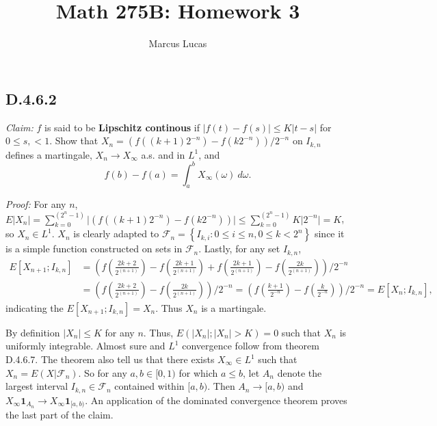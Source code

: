 \documentclass[10pt]{article}
\title{Math 275B: Homework 3}
\author{Marcus Lucas}
\date{\vspace{-1cm}}
\begin{document}
\maketitle

\subsection*{D.4.6.2}
\textit{Claim:} $f$ is said to be \textbf{Lipschitz continous} if
$\vert f(t) - f(s) \vert \le K \vert t-s \vert$ for $0 \le s, < 1$.
Show that $X_n = (f((k+1)2^{-n}) - f(k2^{-n}))/2^{-n}$ on $I_{k,n}$
defines a martingale, $X_n \to X_\infty$ a.s. and in $L^1$, and
\begin{equation*}
  f(b) - f(a) = \int_a^b X_\infty(\omega)\ d\omega.
\end{equation*}

\textit{Proof:} For any $n$, 
$E \vert X_n \vert = \sum_{k=0}^{(2^n-1)} \vert (f((k+1)2^{-n}) - f(k2^{-n})) \vert
\le \sum_{k=0}^{(2^n-1)} K \vert 2^{-n} \vert = K$, so $X_n \in L^1$. $X_n$ is clearly 
adapted to $\mathcal{F}_n = \left\{ I_{k,i}: 0 \le i \le n, 0 \le k < 2^n \right\}$
since it is a simple function constructed on sets in $\mathcal{F}_n$.
Lastly, for any set $I_{k,n}$,
\begin{equation*}
  \begin{aligned}
    E[X_{n+1};I_{k,n}] & = \left(f(\frac{2k+2}{2^{(n+1)}}) - f(\frac{2k+1}{2^{(n+1)}}) 
      + f(\frac{2k+1}{2^{(n+1)}}) - f(\frac{2k}{2^{(n+1)}}) \right)/2^{-n} \\
    & = \left(f(\frac{2k+2}{2^{(n+1)}}) - f(\frac{2k}{2^{(n+1)}}) \right)/2^{-n}
      = \left(f(\frac{k+1}{2^{-n}}) - f(\frac{k}{2^{-n}}) \right)/2^{-n} = E[X_{n};I_{k,n}],
  \end{aligned}
\end{equation*}
indicating the $E[X_{n+1};I_{k,n}] = X_n$. Thus $X_n$ is a martingale.

By definition $\vert X_n \vert \le K$ for any $n$. Thus,
$E(\vert X_n \vert ; \vert X_n \vert > K) = 0$ such that $X_n$
is uniformly integrable. Almost sure and $L^1$ convergence
follow from theorem D.4.6.7. The theorem also tell us that 
there exists $X_\infty \in L^1$ such that $X_n = E(X\vert\mathcal{F}_n)$.
So for any $a,b \in [0,1)$ for which $a\le b$, let $A_n$ denote
the largest interval $I_{k,n} \in \mathcal{F}_n$ contained within $[a,b)$.
Then $A_n \to [a,b)$ and $X_\infty \mathbf{1}_{A_n} 
\to X_\infty \mathbf{1}_{[a,b)}$. An application of the dominated 
convergence theorem proves the last part of the claim.
\end{document}
